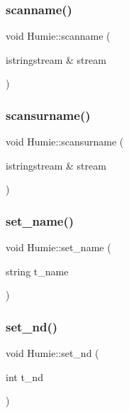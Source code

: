 \mbox{\label{class_humie_a196463eb362d5422496d02a4768fcc96}} 
\subsubsection{\texorpdfstring{scanname()}{scanname()}}
{\footnotesize\ttfamily void Humie\+::scanname (\begin{DoxyParamCaption}\item[{istringstream \&}]{stream }\end{DoxyParamCaption})}

\mbox{\label{class_humie_af74cee32e45f3ca8a8ac006a0c9d6e58}} 
\subsubsection{\texorpdfstring{scansurname()}{scansurname()}}
{\footnotesize\ttfamily void Humie\+::scansurname (\begin{DoxyParamCaption}\item[{istringstream \&}]{stream }\end{DoxyParamCaption})}

\mbox{\label{class_humie_ad017a3f3950555056f3e9e9c904399c8}} 
\subsubsection{\texorpdfstring{set\_name()}{set\_name()}}
{\footnotesize\ttfamily void Humie\+::set\+\_\+name (\begin{DoxyParamCaption}\item[{string}]{t\+\_\+name }\end{DoxyParamCaption})\hspace{0.3cm}{\ttfamily [inline]}}

\mbox{\label{class_humie_aa73ce86c3603663083ae0d5c8b532157}} 
\subsubsection{\texorpdfstring{set\_nd()}{set\_nd()}}
{\footnotesize\ttfamily void Humie\+::set\+\_\+nd (\begin{DoxyParamCaption}\item[{int}]{t\+\_\+nd }\end{DoxyParamCaption})\hspace{0.3cm}{\ttfamily [inline]}}


